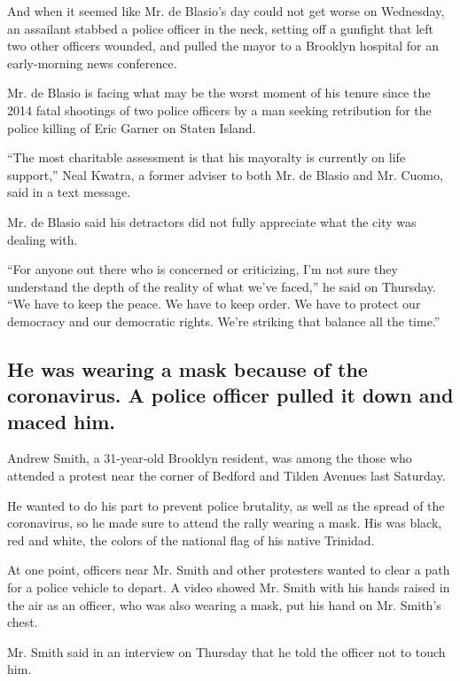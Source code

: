 And when it seemed like Mr. de Blasio's day could not get worse on
Wednesday, an assailant stabbed a police officer in the neck, setting
off a gunfight that left two other officers wounded, and pulled the
mayor to a Brooklyn hospital for an early-morning news conference.

Mr. de Blasio is facing what may be the worst moment of his tenure since
the 2014 fatal shootings of two police officers by a man seeking
retribution for the police killing of Eric Garner on Staten Island.

``The most charitable assessment is that his mayoralty is currently on
life support,'' Neal Kwatra, a former adviser to both Mr. de Blasio and
Mr. Cuomo, said in a text message.

Mr. de Blasio said his detractors did not fully appreciate what the city
was dealing with.

``For anyone out there who is concerned or criticizing, I'm not sure
they understand the depth of the reality of what we've faced,'' he said
on Thursday. ``We have to keep the peace. We have to keep order. We have
to protect our democracy and our democratic rights. We're striking that
balance all the time.''

\hypertarget{he-was-wearing-a-mask-because-of-the-coronavirus-a-police-officer-pulled-it-down-and-maced-him}{%
\subsection{He was wearing a mask because of the coronavirus. A police
officer pulled it down and maced
him.}\label{he-was-wearing-a-mask-because-of-the-coronavirus-a-police-officer-pulled-it-down-and-maced-him}}

Andrew Smith, a 31-year-old Brooklyn resident, was among the those who
attended a protest near the corner of Bedford and Tilden Avenues last
Saturday.

He wanted to do his part to prevent police brutality, as well as the
spread of the coronavirus, so he made sure to attend the rally wearing a
mask. His was black, red and white, the colors of the national flag of
his native Trinidad.

At one point, officers near Mr. Smith and other protesters wanted to
clear a path for a police vehicle to depart. A video showed Mr. Smith
with his hands raised in the air as an officer, who was also wearing a
mask, put his hand on Mr. Smith's chest.

Mr. Smith said in an interview on Thursday that he told the officer not
to touch him.

